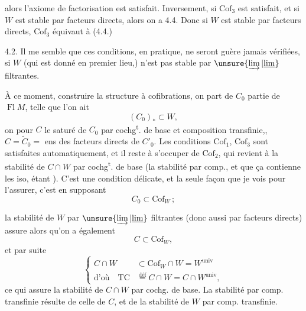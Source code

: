 
alors l'axiome de factorisation  est satisfait. Inversement, si $\mathrm{Cof}_3$ est satisfait, et si $W$ est stable par facteurs directs, alors on a 4.4. Donc si $W$ est stable par facteurs directs, $\mathrm{Cof}_3$ équivaut à (4.4.)

4.2. Il me semble que ces conditions, en pratique, ne seront guère jamais vérifiées,  si $W$ (qui est donné en  premier lieu,) 
n'est  pas stable par $\unsure{\varinjlim|\underline{\lim}}$ filtrantes.

À ce moment,  construire la structure à cofibrations, on part de $C_0$  partie de $\operatorname{Fl}M$,  telle que l'on ait
\[
(C_0)_{*}\subset W,\tag*{(4.5.)}
\]
on  pour  $C$ le saturé  de $C_0$ par cochg\textsuperscript{t}. de base et composition transfinie,,  $C=\widetilde C_0={}$ ens des facteurs directs de $C'_0$. Les conditions $\mathrm{Cof}_1$, $\mathrm{Cof}_3$ sont satisfaites automatiquement, et il reste à s'occuper de $\mathrm{Cof}_2$, qui revient à la stabilité de $C\cap W$ par cochg\textsuperscript{t}. de base (la stabilité par comp., et que ça contienne les iso, étant ). C'est une condition délicate, et la seule façon  que je vois pour l'assurer, c'est en supposant
\[
C_0\subset\mathrm{Cof}_W\,;\tag*{(4.6.)}
\]

la stabilité de $W$ par $\unsure{\varinjlim|\underline{\lim}}$ filtrantes (donc aussi par facteurs directs) assure alors qu'on a également
\[
C\subset\mathrm{Cof}_W,\tag*{(4.7)}
\]
et par suite
\[
\left\{\begin{aligned} C\cap W&\subset\mathrm{Cof}_W\cap W=W^{\mathrm{univ}}\\ \text{d'où}\quad \mathrm{TC}&\overset{\mathrm{déf}}{=}C\cap W=C\cap W^{\mathrm{univ}},
\end{aligned}\right.\tag*{(4.8)}
\]
ce qui assure la stabilité de $C\cap W$ par cochg. de base. La stabilité  par comp. transfinie résulte de celle de $C$, et de la stabilité de $W$ par comp. transfinie.

